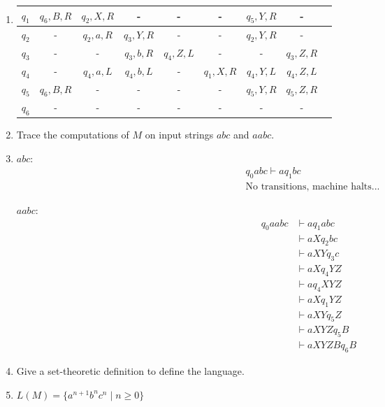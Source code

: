 \documentclass[a4paper, 12pt]{article}
\makeatletter
\renewenvironment{proof}[1][\proofname]{\par
  \normalfont \topsep6\p@\@plus6\p@\relax
  \trivlist
  \item[\hskip\labelsep
        \itshape
    #1\@addpunct{.}]\ignorespaces
}{%
  \endtrivlist\@endpefalse
}
\renewcommand{\proofname}{Solution:}
\makeatother
\begin{document}
\begin{enumerate}
\begin{enumerate}
\begin{proof}
\begin{table}[H]
\begin{tabular}{|c|c|c|c|c|c|c|c|c|}
                            $q_1$ & $q_6, B, R$ & $q_2, X, R$ & - & - & - & $q_5, Y, R$ & - \\ \hline 
                            $q_2$ & - & $q_2, a, R$ & $q_3, Y, R$ & - & - & $q_2, Y, R$ & - \\ \hline
                            $q_3$ & - & - & $q_3, b, R$ & $q_4, Z, L$ & - & - & $q_3, Z, R$ \\ \hline
                            $q_4$ & - & $q_4, a, L$ & $q_4, b, L$ & - & $q_1, X, R$ & $q_4, Y, L$ & $q_4, Z, L$ \\ \hline
                            $q_5$ & $q_6, B, R$ & - & - & - & - & $q_5, Y, R$ & $q_5, Z, R$ \\ \hline
                            $q_6$ & - & - & - & - & - & - & - \\ \hline 
                        \end{tabular}
                    \end{table}
                \end{proof}
            \item Trace the computations of $M$ on input strings $abc$ and $aabc$.
                \begin{proof}
                
                    $abc:$
                    \begin{align*}
                        &q_0abc \vdash aq_1bc \\
                        &\text{No transitions, machine halts...}
                    \end{align*}

                    $aabc$:
                    \begin{align*}
                        q_0aabc &\vdash aq_1abc \\
                        &\vdash aXq_2bc \\
                        &\vdash aXYq_3c \\
                        &\vdash aXq_4YZ \\
                        &\vdash aq_4XYZ \\
                        &\vdash aXq_1YZ \\
                        &\vdash aXYq_5Z \\
                        &\vdash aXYZq_5B \\
                        &\vdash aXYZBq_6B
                    \end{align*}
                \end{proof}
            \item Give a set-theoretic definition to define the language.
                \begin{proof}
                    $L(M)=\{a^{n+1}b^nc^n \mid n \geq 0\}$
                \end{proof}
        \end{enumerate}
    \end{enumerate}
\end{document}
